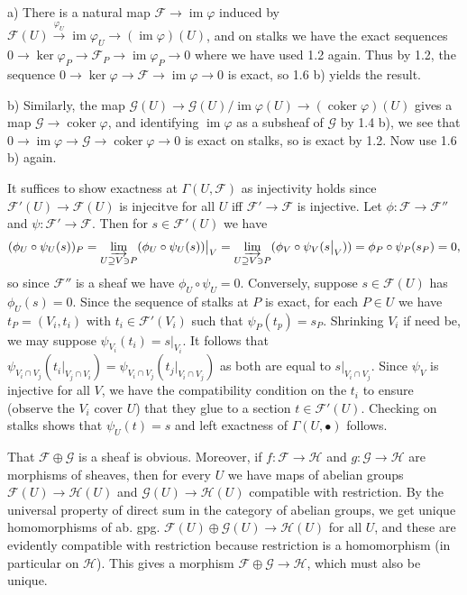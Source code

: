 \documentclass{report}
\DeclareMathOperator{\im}{im}
\newcommand{\F}{\mathcal{F}}
\newcommand{\G}{\mathcal{G}}
\renewcommand{\H}{\mathcal{H}}
\DeclareMathOperator{\coker}{coker}
\begin{document}
\bigskip
{} a)  There is a natural map $\F\rightarrow \im\varphi$ induced by $\F(U)\xrightarrow{\varphi_U} \im \varphi_U\rightarrow (\im\varphi)(U)$,
and on stalks we have the exact sequences $0\rightarrow \ker\varphi_P\rightarrow \F_P\rightarrow \im\varphi_P\rightarrow 0$
where we have used 1.2 again.  Thus by 1.2, the sequence $0\rightarrow \ker\varphi\rightarrow\F\rightarrow\im\varphi\rightarrow 0$
is exact, so 1.6 b) yields the result.

\noindent
b)  Similarly, the map $\G(U)\rightarrow \G(U)/\im \varphi(U)\rightarrow (\coker\varphi )(U)$
gives a map $\G\rightarrow\coker\varphi$, and identifying $\im\varphi$ as a subsheaf of $\G$
by 1.4 b), we see that 
$0\rightarrow \im\varphi\rightarrow \G\rightarrow \coker\varphi\rightarrow 0$ is exact on stalks,
so is exact by 1.2.  Now use 1.6 b) again.


\bigskip
{}	It suffices to show exactness at $\Gamma(U,\F)$ as injectivity holds since $\F'(U)\rightarrow \F(U)$ is injecitve for 
all $U$ iff $\F'\rightarrow \F$ is injective.  Let $\phi:\F\rightarrow\F''$ and $\psi:\F'\rightarrow \F$.
Then for $s\in\F'(U)$ we have 
$$(\phi_U\circ\psi_U (s))_P=\varinjlim_{U\supseteq V\ni P}(\phi_U\circ\psi_U (s))\big|_V= \varinjlim_{U\supseteq V\ni P}(\phi_V\circ\psi_V (s\big|_V))=\phi_P\circ\psi_P(s_P)=0,$$
so since $\F''$ is a sheaf we have $\phi_U\circ\psi_U=0$.  Conversely, suppose $s\in\F(U)$ has $\phi_U(s)=0$.
Since the sequence of stalks at $P$ is exact, for each $P\in U$ we have $t_P=(V_i,t_i)$ with $t_i\in\F'(V_i)$
such that $\psi_P(t_p)=s_P$.  Shrinking $V_i$ if need be, we may suppose $\psi_{V_i}(t_i)=s\big|_{V_i}$.
It follows that $\psi_{V_i\cap V_j}(t_i\big|_{V_j\cap V_i})=\psi_{V_i\cap V_j}(t_j\big|_{V_i\cap V_j})$
as both are equal to $s\big|_{V_i\cap V_j}$.  Since $\psi_V$ is injective for all $V$, we have the compatibility
condition on the $t_i$ to ensure (observe the $V_i$ cover $U$) that they glue to a section $t\in \F'(U)$.
Checking on stalks shows that $\psi_U(t)=s$ and left exactness of $\Gamma(U,\bullet)$ follows.

\bigskip
{}	That $\F\oplus\G$ is a sheaf is obvious.  Moreover, if $f:\F\rightarrow \H$ and $g:\G\rightarrow \H$ are morphisms
of sheaves, then for every $U$ we have maps of abelian groups $\F(U)\rightarrow \H(U)$ and $\G(U)\rightarrow \H(U)$
compatible with restriction.  By the universal property of direct sum in the category of abelian groups,
we get unique homomorphisms of ab. gpg. $\F(U)\oplus \G(U)\rightarrow \H(U)$ for all $U$, and these are evidently
compatible with restriction because restriction is a homomorphism (in particular on $\H$).  This gives a morphism
$\F\oplus\G\rightarrow \H$, which must also be unique.
\end{document}
